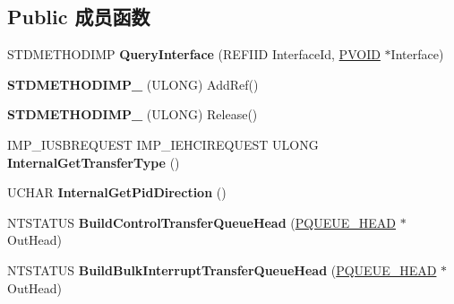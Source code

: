 \subsection*{Public 成员函数}
\begin{DoxyCompactItemize}
\item 
\mbox{\label{class_c_u_s_b_request_a3d7d6989e63d96bf70a78666e643eb15}} 
S\+T\+D\+M\+E\+T\+H\+O\+D\+I\+MP {\bfseries Query\+Interface} (R\+E\+F\+I\+ID Interface\+Id, \hyperlink{interfacevoid}{P\+V\+O\+ID} $\ast$Interface)
\item 
\mbox{\label{class_c_u_s_b_request_ac0b1c70c2b98ff19e9a94b94b7fb460c}} 
{\bfseries S\+T\+D\+M\+E\+T\+H\+O\+D\+I\+M\+P\+\_\+} (U\+L\+O\+NG) Add\+Ref()
\item 
\mbox{\label{class_c_u_s_b_request_afed0e2345a488509c5260d555c2da79c}} 
{\bfseries S\+T\+D\+M\+E\+T\+H\+O\+D\+I\+M\+P\+\_\+} (U\+L\+O\+NG) Release()
\item 
\mbox{\label{class_c_u_s_b_request_aec4f130e4936bc1699094132b9f74de0}} 
I\+M\+P\+\_\+\+I\+U\+S\+B\+R\+E\+Q\+U\+E\+ST I\+M\+P\+\_\+\+I\+E\+H\+C\+I\+R\+E\+Q\+U\+E\+ST U\+L\+O\+NG {\bfseries Internal\+Get\+Transfer\+Type} ()
\item 
\mbox{\label{class_c_u_s_b_request_a907750f1eae3e8941ed48e267dfa065c}} 
U\+C\+H\+AR {\bfseries Internal\+Get\+Pid\+Direction} ()
\item 
\mbox{\label{class_c_u_s_b_request_ae47112b2b74a99e18fda1117a21cf80c}} 
N\+T\+S\+T\+A\+T\+US {\bfseries Build\+Control\+Transfer\+Queue\+Head} (\hyperlink{struct___q_u_e_u_e___h_e_a_d}{P\+Q\+U\+E\+U\+E\+\_\+\+H\+E\+AD} $\ast$Out\+Head)
\item 
\mbox{\label{class_c_u_s_b_request_a0fae21c001ba1ef903e335911e569ed1}} 
N\+T\+S\+T\+A\+T\+US {\bfseries Build\+Bulk\+Interrupt\+Transfer\+Queue\+Head} (\hyperlink{struct___q_u_e_u_e___h_e_a_d}{P\+Q\+U\+E\+U\+E\+\_\+\+H\+E\+AD} $\ast$Out\+Head)
\item 
\mbox{\label{class_c_u_s_b_request_abaf8643811e5478f0b886610c8daaed1}} 

\end{DoxyCompactItemize}
